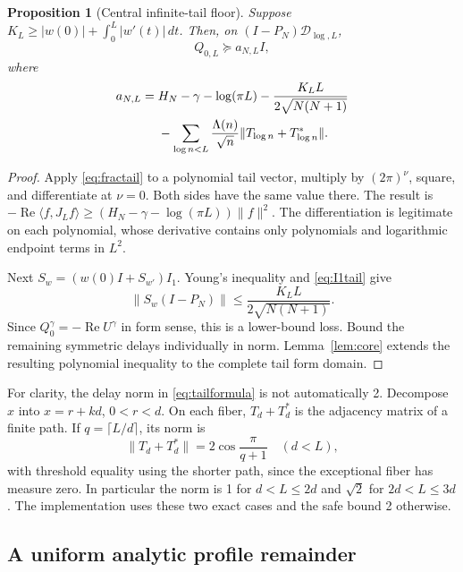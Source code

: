 \documentclass[11pt]{article}
\numberwithin{equation}{section}
\newtheorem{proposition}[theorem]{Proposition}
\theoremstyle{definition}
\theoremstyle{remark}
\newcommand{\DD}{\mathcal D}
\newcommand{\Rea}{\operatorname{Re}}
\newcommand{\norm}[1]{\lVert#1\rVert}
\newcommand{\ip}[2]{\langle#1,#2\rangle}
\begin{document}
\begin{proposition}[Central infinite-tail floor]\label{prop:tail}
Suppose
$K_L\ge |w(0)|+\int_0^L|w'(t)|\,dt$. Then, on
$(I-P_N)\DD_{\log,L}$,
\begin{equation}\label{eq:afloor}
 Q_{0,L}\succeq a_{N,L}I,
\end{equation}
where
\begin{align}
 a_{N,L}={}&H_N-\gamma-\log(\pi L)
 -\frac{K_LL}{2\sqrt{N(N+1)}}\notag\\
 &-\sum_{\log n<L}\frac{\Lambda(n)}{\sqrt n}
 \norm{T_{\log n}+T_{\log n}^*}.
 \label{eq:tailformula}
\end{align}
\end{proposition}
\begin{proof}
Apply \eqref{eq:fractail} to a polynomial tail vector, multiply by
$(2\pi)^\nu$, square, and differentiate at $\nu=0$. Both sides have the
same value there. The result is
$-\Rea\ip f{J_Lf}\ge(H_N-\gamma-\log(\pi L))\norm f^2$.
The differentiation is legitimate on each polynomial, whose derivative
contains only polynomials and logarithmic endpoint terms in $L^2$.

Next $S_w=(w(0)I+S_{w'})I_1$. Young's inequality and \eqref{eq:I1tail}
give
\[
 \norm{S_w(I-P_N)}\le\frac{K_LL}{2\sqrt{N(N+1)}}.
\]
Since $Q^\gamma_0=-\Rea U^\gamma$ in form sense, this is a lower-bound
loss. Bound the remaining symmetric delays individually in norm.
Lemma~\ref{lem:core} extends the resulting polynomial inequality to the
complete tail form domain.
\end{proof}

For clarity, the delay norm in \eqref{eq:tailformula} is not automatically 2.
Decompose $x$ into $x=r+kd$, $0<r<d$. On each fiber,
$T_d+T_d^*$ is the adjacency matrix of a finite path. If
$q=\lceil L/d\rceil$, its norm is
\begin{equation}\label{eq:chainnorm}
 \norm{T_d+T_d^*}=2\cos\frac{\pi}{q+1}
 \quad(d<L),
\end{equation}
with threshold equality using the shorter path, since the exceptional fiber
has measure zero. In particular the norm is 1 for $d<L\le2d$ and
$\sqrt2$ for $2d<L\le3d$. The implementation uses these two exact cases
and the safe bound 2 otherwise.

\subsection{A uniform analytic profile remainder}
\end{document}
